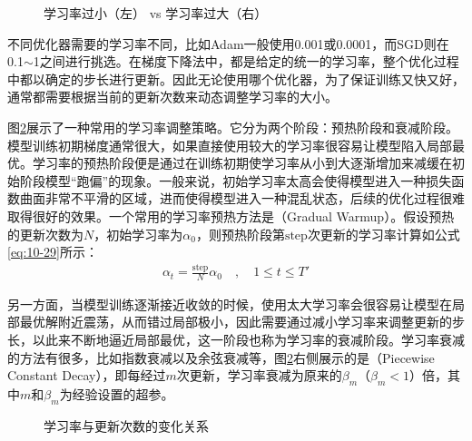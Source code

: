 \begin{figure}[htp]
\centering

\caption{学习率过小（左） vs 学习率过大（右） }
\label{fig:10-25}
\end{figure}

\parinterval 不同优化器需要的学习率不同，比如Adam一般使用0.001或0.0001，而SGD则在0.1$\sim$1之间进行挑选。在梯度下降法中，都是给定的统一的学习率，整个优化过程中都以确定的步长进行更新。因此无论使用哪个优化器，为了保证训练又快又好，通常都需要根据当前的更新次数来动态调整学习率的大小。
\vspace{0.5em}


\parinterval 图\ref{fig:10-26}展示了一种常用的学习率调整策略。它分为两个阶段：预热阶段和衰减阶段。模型训练初期梯度通常很大，如果直接使用较大的学习率很容易让模型陷入局部最优。学习率的预热阶段便是通过在训练初期使学习率从小到大逐渐增加来减缓在初始阶段模型“跑偏”的现象。一般来说，初始学习率太高会使得模型进入一种损失函数曲面非常不平滑的区域，进而使得模型进入一种混乱状态，后续的优化过程很难取得很好的效果。一个常用的学习率预热方法是{\small{}}（Gradual Warmup）。假设预热的更新次数为$N$，初始学习率为$\alpha_0$，则预热阶段第$\textrm{step}$次更新的学习率计算如公式\eqref{eq:10-29}所示：
\begin{eqnarray}
\alpha_t = \frac{\textrm{step}}{N} \alpha_0 \quad,\quad 1 \leq t \leq T'
\label{eq:10-29}
\end{eqnarray}

\noindent 另一方面，当模型训练逐渐接近收敛的时候，使用太大学习率会很容易让模型在局部最优解附近震荡，从而错过局部极小，因此需要通过减小学习率来调整更新的步长，以此来不断地逼近局部最优，这一阶段也称为学习率的衰减阶段。学习率衰减的方法有很多，比如指数衰减以及余弦衰减等，图\ref{fig:10-26}右侧展示的是{\small{}}（Piecewise Constant Decay），即每经过$m$次更新，学习率衰减为原来的$\beta_m$（$\beta_m<1$）倍，其中$m$和$\beta_m$为经验设置的超参。

\begin{figure}[htp]
\centering

\caption{学习率与更新次数的变化关系}
\label{fig:10-26}
\end{figure}

